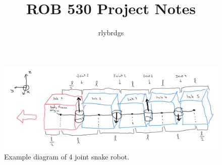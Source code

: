 \documentclass[11pt]{article}
\title{ROB 530 Project Notes}
\author{rlybrdgs }
\begin{document}
\maketitle

\begin{figure}[H]
    \centering
    \includegraphics[width=1.2\textwidth]{snake_diagram.jpg}
    \caption{Example diagram of 4 joint snake robot.}
\end{figure}
\newpage 
\end{document}
